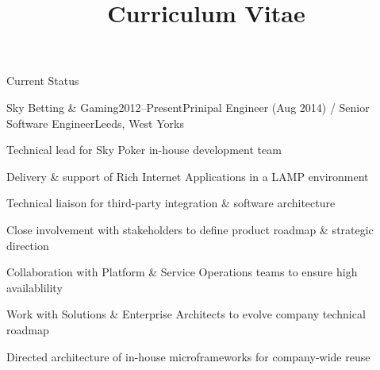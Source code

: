\documentclass{cv}
\title{Curriculum Vitae}
\begin{document}

\begin{rSection}{Current Status}

\begin{rSubsection}{Sky Betting \& Gaming}{2012--Present}{Prinipal Engineer (Aug 2014) / Senior Software Engineer}{Leeds, West Yorks}
\item Technical lead for Sky Poker in-house development team
\item Delivery \& support of Rich Internet Applications in a LAMP environment
\item Technical liaison for third-party integration \& software architecture
\item Close involvement with stakeholders to define product roadmap \& strategic direction
\item Collaboration with Platform \& Service Operations teams to ensure high availablility
\item Work with Solutions \& Enterprise Architects to evolve company technical roadmap
\item Directed architecture of in-house microframeworks for company-wide reuse
\end{rSubsection}

\end{rSection}

\end{document}
